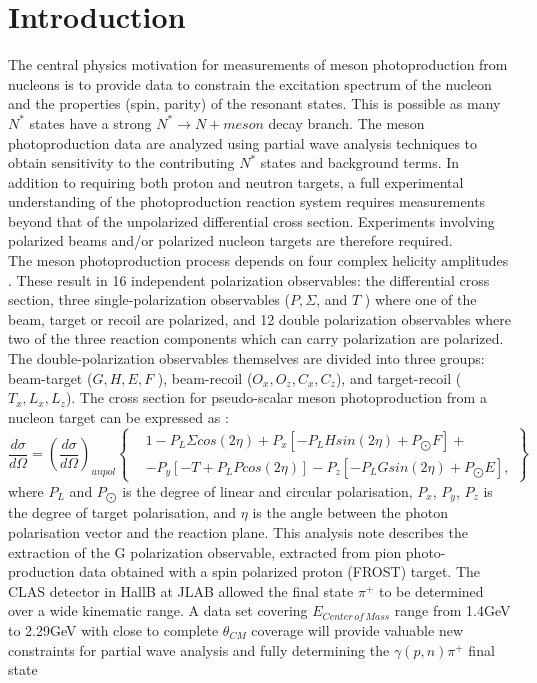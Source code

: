 \section{Introduction}
The central physics motivation for measurements of meson photoproduction from nucleons is to provide data to constrain the excitation spectrum of the nucleon and the properties (spin, parity) of the resonant states.  This is possible as many $N^*$ states have a strong $N^*\rightarrow N + meson$  decay branch.  The meson photoproduction data are analyzed using partial wave analysis techniques to obtain sensitivity to the contributing $N^*$ states and background terms.
In addition to requiring both proton and neutron targets, a full experimental understanding of the photoproduction reaction system requires measurements
beyond that of the unpolarized differential cross section. Experiments involving polarized beams and/or polarized nucleon targets are therefore required. \\
The meson photoproduction process depends on four complex helicity amplitudes \cite{PhysRev.106.1337} \cite{PhysRev.106.1345}. These result in 16 independent polarization observables: the differential cross section, three single-polarization observables ($P, \Sigma$, and $T$ ) where one of the beam, target
or recoil are polarized, and 12 double polarization observables where two of the three reaction components which can carry polarization are polarized. The
double-polarization observables themselves are divided into three groups: beam-target ($G, H, E, F$ ), beam-recoil ($O_x , O_z, C_x , C_z$), and target-recoil ($T_x , L_x , L_z$).
The cross section for pseudo-scalar meson photoproduction from a nucleon target can be expressed as \cite{Bark_1974}:
\begin{equation}
\frac{d\sigma}{d\Omega} = \left(\frac{d\sigma}{d\Omega} \right)_{unpol}  \left\{ 
\begin{aligned}
    & 1 - P_L \Sigma cos(2\eta) + P_x \left[-P_L H sin(2\eta) + P_{\bigodot}F\right] + \\
& -P_y \left[ -T +P_L P cos(2\eta)\right] -P_z \left[-P_L G sin(2\eta) + P_{\bigodot}E\right],
\end{aligned}
\right\} 
\label{eqn:CGLN}
\end{equation}
where $P_L$ and $P_{\bigodot}$ is the degree of linear and circular polarisation, $P_x$, $P_y$, $P_z$ is the degree of target polarisation, and $\eta$ is the angle between the photon polarisation vector and the reaction plane.  
This analysis note describes the extraction of the G polarization observable, extracted from pion photo-production data obtained with a spin polarized proton (FROST) target. The CLAS detector in HallB at JLAB allowed the final state $\pi^+$ to be determined over a wide kinematic range. A data set covering $E_{Center\, of\, Mass}$ range from 1.4GeV to 2.29GeV with close to complete $\theta_{CM}$ coverage will provide valuable new constraints for partial wave analysis and fully determining the $\gamma (p,n)\pi^+$ final state

